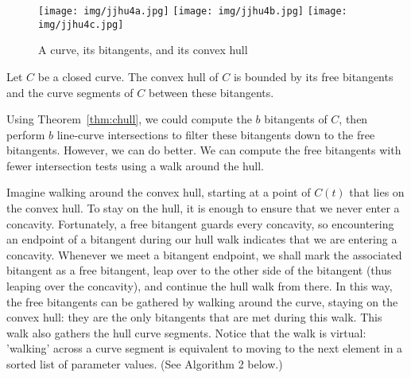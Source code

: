 \documentclass[12pt]{article}
\begin{document}
\begin{figure}
\begin{center}
\texttt{[image: img/jjhu4a.jpg]}
\texttt{[image: img/jjhu4b.jpg]}
\texttt{[image: img/jjhu4c.jpg]}
\end{center}
\caption{A curve, its bitangents, and its convex hull}
\label{fig:convhullob3a}
\end{figure}

\begin{theorem}
\label{thm:chull}
Let $C$ be a closed curve.
The convex hull of $C$ is bounded by its free bitangents
and the curve segments of $C$ between these bitangents.
\end{theorem}


Using Theorem~\ref{thm:chull}, we could compute the $b$ bitangents of $C$,
then perform $b$ line-curve intersections to filter these bitangents 
down to the free bitangents. 
However, we can do better.
We can compute the free bitangents with fewer intersection tests
using a walk around the hull.

Imagine walking around the convex hull, starting at a point of $C(t)$
that lies on the convex hull.
To stay on the hull, it is enough to ensure that we never enter a concavity.
Fortunately, a free bitangent guards every concavity,
so encountering an endpoint of a bitangent during our hull walk
indicates that we are entering a concavity.
Whenever we meet a bitangent endpoint, we shall mark the associated bitangent
as a free bitangent, leap over to the other side of the bitangent
(thus leaping over the concavity), and continue the hull walk from there.
In this way, the free bitangents can be gathered by walking around the curve,
staying on the convex hull:
they are the only bitangents that are met during this walk.
This walk also gathers the hull curve segments.
Notice that the walk is virtual:
'walking' across a curve segment is equivalent to moving to the next
element in a sorted list of parameter values.  (See Algorithm 2 below.)
\end{document}
